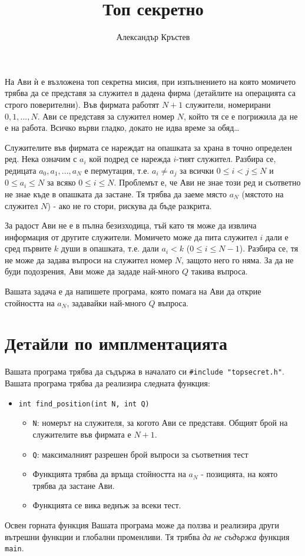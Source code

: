 \documentclass[a4paper,11pt]{article}
\title{Топ секретно}
\author{Александър Кръстев}
\date{}
\newcommand{\code}[1]{\texttt{#1}}
\newcommand{\noskip}{\vspace{-\parskip}}
\begin{document}
{%
    \centering \LARGE 
    \textbf{\@title}
    \par
}
На Ави ѝ е възложена топ секретна мисия, при изпълнението на която момичето
трябва да се представя за служител в дадена фирма
(детайлите на операцията са строго поверителни).
Във фирмата работят $N+1$ служители, номерирани $0, 1, ..., N$.
Ави се представя за служител номер $N$, който тя се е погрижила да не е на
работа.
Всичко върви гладко, докато не идва време за обяд…

Служителите във фирмата се нареждат на опашката за храна в точно определен ред.
Нека означим с $a_i$ кой подред се нарежда $i$-тият служител.
Разбира се, редицата $a_0, a_1, ..., a_N$ е пермутация, т.е. $a_i \neq a_j$ 
за всички $0 \leq i < j \leq N$ и $0 \leq a_i \leq N$ за всяко
$0 \leq i \leq N$.
Проблемът е, че Ави не знае този ред и съответно не знае къде в опашката да
застане.
Тя трябва да заеме място $a_N$ (мястото на служител $N$) - ако не го стори,
рискува да бъде разкрита.

За радост Ави не е в пълна безизходица, тъй като тя може да извлича информация
от другите служители.
Момичето може да пита служител $i$ дали е сред първите $k$ души в опашката, т.е.
дали $a_i < k$ ($0 \leq i \leq N - 1$).
Разбира се, тя не може да задава въпроси на служител номер $N$, защото него го
няма.
За да не буди подозрения, Ави може да зададе най-много $Q$ такива въпроса.

Вашата задача е да напишете програма, която помага на Ави да открие стойността
на $a_N$, задавайки най-много $Q$ въпроса.

\section*{Детайли по имплментацията}
Вашата програма трябва да съдържа в началато си \code{\#include "topsecret.h"}.
\\
Вашата програма трябва да реализира следната функция:
\noskip
\begin{itemize}
    \item \code{int find\_position(int N, int Q)}
    \begin{itemize}
        \item \code{N}: номерът на служителя, за когото Ави се представя.
            Общият брой на служителите във фирмата е $N+1$.
        \item \code{Q}: максималният разрешен брой въпроси за съответния тест
        \item Функцията трябва да връща стойността на $a_N$ - позицията, на
            която трябва да застане Ави.
        \item Функцията се вика веднъж за всеки тест.
    \end{itemize}
\end{itemize}
Освен горната функция Вашата програма може да ползва и реализира други вътрешни 
функции и глобални променливи.
Тя трябва \textit{да не съдържа} функция \code{main}.
\end{document}

